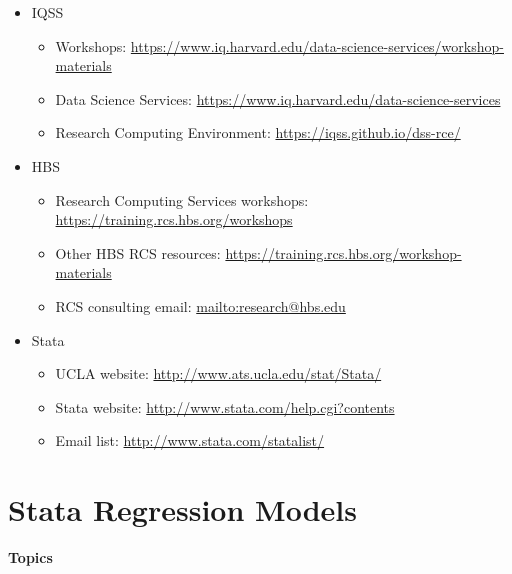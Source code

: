 \documentclass[
]{book}
\providecommand{\tightlist}{%
  \setlength{\itemsep}{0pt}\setlength{\parskip}{0pt}}
\begin{document}
\begin{itemize}
\tightlist
\item
  IQSS

  \begin{itemize}
  \tightlist
  \item
    Workshops: \url{https://www.iq.harvard.edu/data-science-services/workshop-materials}
  \item
    Data Science Services: \url{https://www.iq.harvard.edu/data-science-services}
  \item
    Research Computing Environment: \url{https://iqss.github.io/dss-rce/}
  \end{itemize}
\item
  HBS

  \begin{itemize}
  \tightlist
  \item
    Research Computing Services workshops: \url{https://training.rcs.hbs.org/workshops}
  \item
    Other HBS RCS resources: \url{https://training.rcs.hbs.org/workshop-materials}
  \item
    RCS consulting email: \url{mailto:research@hbs.edu}
  \end{itemize}
\item
  Stata

  \begin{itemize}
  \tightlist
  \item
    UCLA website: \url{http://www.ats.ucla.edu/stat/Stata/}
  \item
    Stata website: \url{http://www.stata.com/help.cgi?contents}
  \item
    Email list: \url{http://www.stata.com/statalist/}
  \end{itemize}
\end{itemize}

\hypertarget{stata-regression-models}{%
\chapter{Stata Regression Models}\label{stata-regression-models}}

\textbf{Topics}
\end{document}
